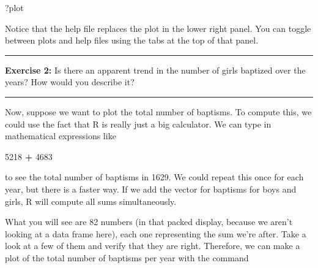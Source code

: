 \documentclass[]{book}
\newenvironment{Shaded}{\begin{snugshade}}{\end{snugshade}}
\newcommand{\KeywordTok}[1]{\textcolor[rgb]{0.13,0.29,0.53}{\textbf{#1}}}
\newcommand{\DataTypeTok}[1]{\textcolor[rgb]{0.13,0.29,0.53}{#1}}
\newcommand{\DecValTok}[1]{\textcolor[rgb]{0.00,0.00,0.81}{#1}}
\newcommand{\StringTok}[1]{\textcolor[rgb]{0.31,0.60,0.02}{#1}}
\newcommand{\OperatorTok}[1]{\textcolor[rgb]{0.81,0.36,0.00}{\textbf{#1}}}
\newcommand{\NormalTok}[1]{#1}
\theoremstyle{definition}
\theoremstyle{definition}
\theoremstyle{definition}
\theoremstyle{remark}
\begin{document}
\begin{Shaded}
\begin{Highlighting}[]
\NormalTok{?plot}
\end{Highlighting}
\end{Shaded}

Notice that the help file replaces the plot in the lower right panel.
You can toggle between plots and help files using the tabs at the top of
that panel.

\begin{center}\rule{0.5\linewidth}{\linethickness}\end{center}

\textbf{Exercise 2:} Is there an apparent trend in the number of girls
baptized over the years? How would you describe it?

\begin{center}\rule{0.5\linewidth}{\linethickness}\end{center}

Now, suppose we want to plot the total number of baptisms. To compute
this, we could use the fact that R is really just a big calculator. We
can type in mathematical expressions like

\begin{Shaded}
\begin{Highlighting}[]
\DecValTok{5218} \OperatorTok{+}\StringTok{ }\DecValTok{4683}
\end{Highlighting}
\end{Shaded}

to see the total number of baptisms in 1629. We could repeat this once
for each year, but there is a faster way. If we add the vector for
baptisms for boys and girls, R will compute all sums simultaneously.

\begin{Shaded}
\end{Shaded}

What you will see are 82 numbers (in that packed display, because we
aren't looking at a data frame here), each one representing the sum
we're after. Take a look at a few of them and verify that they are
right. Therefore, we can make a plot of the total number of baptisms per
year with the command

\begin{Shaded}
\end{Shaded}
\end{document}

